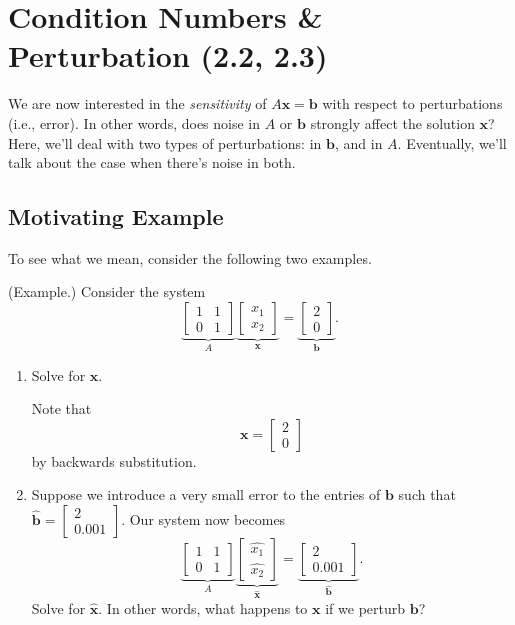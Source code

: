 \documentclass[letterpaper]{article}
\newcommand{\0}{\mathbf{0}}
\renewcommand{\b}{\mathbf{b}}
\newcommand{\x}{\mathbf{x}}
\begin{document}
\section{Condition Numbers \& Perturbation (2.2, 2.3)}
We are now interested in the \emph{sensitivity} of $A\x = \b$ with respect to perturbations (i.e., error). In other words, does noise in $A$ or $\b$ strongly affect the solution $\x$? Here, we'll deal with two types of perturbations: in $\b$, and in $A$. Eventually, we'll talk about the case when there's noise in both. 

\subsection{Motivating Example}
To see what we mean, consider the following two examples.
\begin{mdframed}
    (Example.) Consider the system 
    \[\underbrace{\begin{bmatrix}
        1 & 1 \\ 0 & 1 
    \end{bmatrix}}_A \underbrace{\begin{bmatrix}
        x_1 \\ x_2
    \end{bmatrix}}_{\x} = \underbrace{\begin{bmatrix}
        2 \\ 0
    \end{bmatrix}}_{\b}.\]

    \begin{enumerate}
        \item Solve for $\x$. 
        \begin{mdframed}
            Note that \[\x = \begin{bmatrix}
                2 \\ 0
            \end{bmatrix}\] by backwards substitution.
        \end{mdframed}

        \item Suppose we introduce a very small error to the entries of $\b$ such that $\hat{\b} = \begin{bmatrix}
            2 \\ 0.001
        \end{bmatrix}.$ Our system now becomes \[\underbrace{\begin{bmatrix}
            1 & 1 \\ 0 & 1 
        \end{bmatrix}}_A \underbrace{\begin{bmatrix}
            \hat{x_1} \\ \hat{x_2}
        \end{bmatrix}}_{\hat{\x}} = \underbrace{\begin{bmatrix}
            2 \\ 0.001
        \end{bmatrix}}_{\hat{\b}}.\] Solve for $\hat{\x}$. In other words, what happens to $\x$ if we perturb $\b$?  


\end{enumerate}
\end{mdframed}
\end{document}
